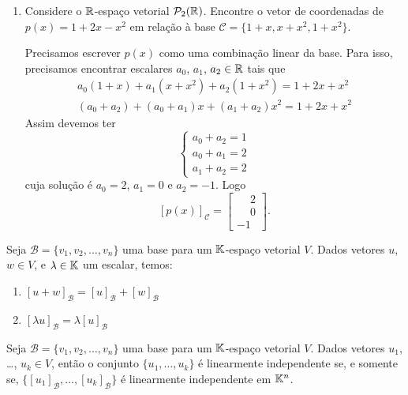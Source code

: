\begin{exemplos}
\begin{enumerate}
    \item Considere o $\mathbb{R}$-espaço vetorial $\mathcal{P}_2(\mathbb{R})$. Encontre o vetor de coordenadas de $p(x) = 1 + 2x - x^2$ em relação à base $\mathcal{C} = \{1 + x, x + x^2, 1 + x^2\}$.
      \begin{solucao}
        Precisamos escrever $p(x)$ como uma combinação linear da base. Para isso, precisamos encontrar escalares $a_0$, $a_1$, $a_2 \in \mathbb{R}$ tais que
        \begin{align*}
          a_0(1 + x) + a_1(x + x^2) + a_2(1 + x^2) = 1 + 2x + x^2\\
          (a_0 + a_2) + (a_0 + a_1)x + (a_1 + a_2)x^2 = 1 + 2x + x^2
        \end{align*}
        Assim devemos ter
        \[
          \begin{cases}
            a_0 + a_2 = 1\\
            a_0 + a_1 = 2\\
            a_1 + a_2 = 2
          \end{cases}
        \]
        cuja solução é $a_0 = 2$, $a_1 = 0$ e $a_2 = -1$. Logo
        \[
          [p(x)]_\mathcal{C} = \begin{bmatrix}\phantom{-}2\\\phantom{-}0\\-1\end{bmatrix}.
        \]
      \end{solucao}
  \end{enumerate}

  
\begin{teorema}
  Seja $\mathcal{B} = \{v_1, v_2, \dots, v_n\}$ uma base para um $\mathbb{K}$-espaço vetorial $V$. Dados vetores $u$, $w \in V$, e $\lambda \in \mathbb{K}$ um escalar, temos: 
  \begin{enumerate}[label={\roman*})]
    \item $[u + w]_\mathcal{B} = [u]_\mathcal{B} + [w]_\mathcal{B}$ 

    \item $[\lambda u]_\mathcal{B} = \lambda[u]_\mathcal{B}$ 
  \end{enumerate}
\end{teorema}

\begin{teorema}
  Seja $\mathcal{B} = \{v_1, v_2, \dots, v_n\}$ uma base para um $\mathbb{K}$-espaço vetorial $V$. Dados vetores $u_1$, \dots, $u_k \in V$, então o conjunto $\{u_1, \dots, u_k\}$ é linearmente independente se, e somente se,  $\{[u_1]_\mathcal{B}, \dots, [u_k]_\mathcal{B}\}$ é linearmente independente em $\mathbb{K}^n$.
\end{teorema}


\end{exemplos}
